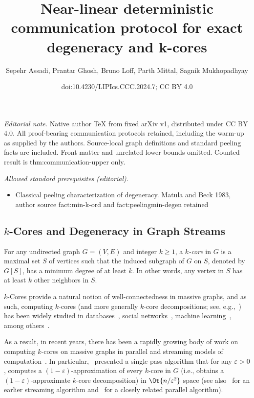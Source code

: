 \documentclass[11pt,letterpaper]{article}
\title{Near-linear deterministic communication protocol for exact degeneracy and k-cores}
\author{Sepehr Assadi, Prantar Ghosh, Bruno Loff, Parth Mittal, Sagnik Mukhopadhyay}
\date{doi:10.4230/LIPIcs.CCC.2024.7; CC BY 4.0}
\newcommand{\eps}{\varepsilon}
\renewcommand{\geq}{\geqslant}
\theoremstyle{definition}
\begin{document}
\maketitle
\setcounter{section}{6}
\noindent\textit{Editorial note.} Native author TeX from fixed arXiv v1, distributed under CC BY 4.0. All proof-bearing communication protocols retained, including the warm-up as supplied by the authors. Source-local graph definitions and standard peeling facts are included. Front matter and unrelated lower bounds omitted. Counted result is thm:communication-upper only.\par\medskip
\noindent\textit{Allowed standard prerequisites (editorial).}\begin{itemize}
\item Classical peeling characterization of degeneracy. Matula and Beck 1983, author source fact:min-k-ord and fact:peelingmin-degen retained
\end{itemize}\medskip
\subsection{\texorpdfstring{$k$-Cores}{k-Cores} and Degeneracy in Graph Streams}\label{sec:degen-intro}

For any undirected graph $G=(V,E)$ and integer $k \geq 1$, a \emph{$k$-core} in $G$ is a maximal set $S$ of vertices such that the induced subgraph of $G$ on $S$, denoted by $G[S]$, has a minimum degree of at least $k$. In other words, 
any vertex in $S$ has at least $k$ other neighbors in $S$. 

$k$-Cores provide a natural notion of well-connectedness in massive graphs, and as such, computing $k$-cores (and more generally $k$-core decompositions; see, e.g.,~\cite{LiuSYDS22}) 
has been widely studied in databases~\cite{BonchiGKV14, ChuZ00ZXZ20, LiZZQZL19}, social networks~\cite{DhulipalaBS17, DhulipalaBS18, KhaouidBST15}, machine learning~\cite{Alvarez-HamelinDBV05, EsfandiariLM18, GhaffariLM19}, 
among others~\cite{LiWSX18,GalimbertiBGL20, SariyuceGJWC13}. 

As a result, in recent years, there has been a rapidly growing body of work on
computing $k$-cores on massive graphs in parallel and streaming
models of computation~\cite{SariyuceGJWC13,DhulipalaBS17, DhulipalaBS18,EsfandiariLM18, GhaffariLM19,LiuSYDS22}. In particular,~\cite{EsfandiariLM18} presented a single-pass algorithm that for any $\eps > 0$, 
computes a $(1-\eps)$-approximation of every $k$-core in $G$ (i.e., obtains a $(1-\eps)$-approximate $k$-core decomposition) in $\Ot{n/\eps^2}$ space (see also~\cite{SariyuceGJWC13} for an earlier streaming algorithm and~\cite{GhaffariLM19}
for a closely related parallel algorithm). 
\end{document}
